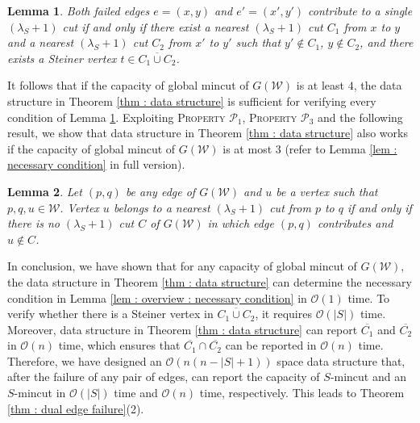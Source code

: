 \documentclass[letterpaper,11pt]{article}
\newtheorem{lemma}{Lemma}[]
\begin{document}
\begin{lemma} \label{lem : conditions of dual edge failures}
    Both failed edges $e=(x,y)$ and $e'=(x',y')$ contribute to a single $(\lambda_S+1)$ cut if and only if there exist a nearest $(\lambda_S+1)$ cut $C_1$ from $x$ to $y$ and a nearest $(\lambda_S+1)$ cut $C_2$ from $x'$ to $y'$ such that $y'\notin C_1$, $y\notin C_2$, and there exists a Steiner vertex $t\in \overline{C_1\cup C_2}$.
\end{lemma}
It follows that if the capacity of global mincut of $G({\mathcal W})$ is at least $4$, the data structure in Theorem \ref{thm : data structure} is sufficient for verifying every condition of Lemma \ref{lem : conditions of dual edge failures}. Exploiting \textsc{Property ${\mathcal P}_1$}, \textsc{Property ${\mathcal P}_3$} and the following result, we show that data structure in Theorem \ref{thm : data structure} also works if the capacity of global mincut of $G({\mathcal W})$ is at most $3$ (refer to Lemma \ref{lem : necessary condition} in full version).
\begin{lemma}
    Let $(p,q)$ be any edge of $G({\mathcal W})$ and $u$ be a vertex such that $p,q,u\in {\mathcal W}$. Vertex $u$ belongs to a nearest $(\lambda_S+1)$ cut from $p$ to $q$ if and only if there is no $(\lambda_S+1)$ cut $C$ of $G({\mathcal W})$ in which edge $(p,q)$ contributes and $u\notin C$.
\end{lemma}
In conclusion, we have shown that for any capacity of global mincut of $G({\mathcal W})$, the data structure in Theorem \ref{thm : data structure} can determine the necessary condition in Lemma \ref{lem : overview : necessary condition} in ${\mathcal O}(1)$ time. To verify whether there is a Steiner vertex in $\overline{C_1\cup C_2}$, it requires ${\mathcal O}(|S|)$ time. Moreover, data structure in Theorem \ref{thm : data structure} can report $\overline{C_1}$ and $\overline{C_2}$ in ${\mathcal O}(n)$ time, which ensures that ${\overline{C_1}\cap \overline{C_2}}$ can be reported in ${\mathcal O}(n)$ time. Therefore, we have designed an ${\mathcal O}(n(n-|S|+1))$ space data structure that, after the failure of any pair of edges, can report the capacity of $S$-mincut and an $S$-mincut in ${\mathcal O}(|S|)$ time and ${\mathcal O}(n)$ time, respectively. This leads to Theorem \ref{thm : dual edge failure}(2).
\end{document}
